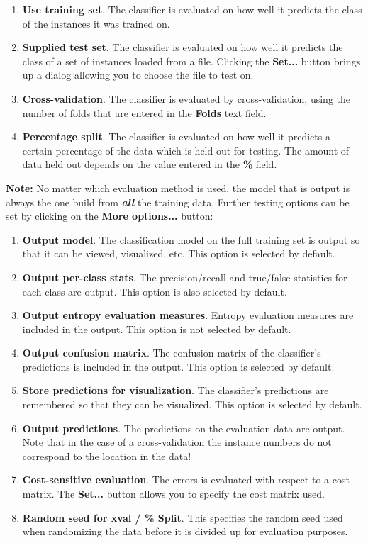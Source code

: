 \documentclass[a4paper]{article}
\begin{document}
\begin{enumerate}
\item \textbf{Use training set}.
The classifier is evaluated on how well it predicts the class of the instances
it was trained on. 
\item \textbf{Supplied test set}.
The classifier is evaluated on how well it predicts the class of a set of
instances loaded from a file. Clicking the \textbf{Set...} button brings up a
dialog allowing you to choose the file to test on.
\item \textbf{Cross-validation}.
The classifier is evaluated by cross-validation, using the number of folds that
are entered in the \textbf{Folds} text field. 
\item \textbf{Percentage split}.
The classifier is evaluated on how well it predicts a certain percentage of the
data which is held out for testing. The amount of data held out depends on the
value entered in the \textbf{\%} field.
\end{enumerate}
\noindent
\textbf{Note:} No matter which evaluation method is used, the model
that is output is always the one build from \textbf{\em all} the training data.
\noindent
Further testing options can be set by clicking on the \textbf{More options...}
button:

\begin{enumerate}
\item \textbf{Output model}.
The classification model on the full training set is output so that it can be
viewed, visualized, etc. This option is selected by default.
\item \textbf{Output per-class stats}.  The precision/recall and
true/false statistics for each class are output. This option is also
selected by default.
\item \textbf{Output entropy evaluation measures}.  Entropy evaluation
measures are included in the output. This option is not selected by
default.
\item \textbf{Output confusion matrix}.
The confusion matrix of the classifier's predictions is included in the output. This option is selected by default.
\item \textbf{Store predictions for visualization}.  The classifier's
predictions are remembered so that they can be visualized. This option
is selected by default.
\item \textbf{Output predictions}. The predictions on the evaluation
data are output.  Note that in the case of a cross-validation the
instance numbers do not correspond to the location in the data!
\item \textbf{Cost-sensitive evaluation}.
The errors is evaluated with respect to a cost matrix. The \textbf{Set...}
button allows you to specify the cost matrix used. 
\item \textbf{Random seed for xval / \% Split}.
This specifies the random seed used when randomizing the data before it is
divided up for evaluation purposes.
\end{enumerate}
\end{document}
